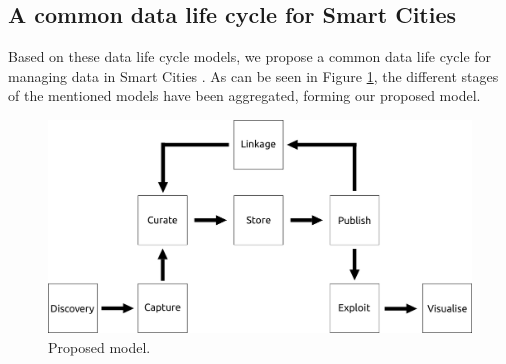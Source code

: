 \subsection{A common data life cycle for Smart Cities}

Based on these data life cycle models, we propose a common data life cycle  for managing data in Smart Cities . As can be seen in Figure \ref{fig:model}, the different stages of the mentioned models have been aggregated, forming our proposed model.

\begin{figure}
    \center
    \includegraphics[width=0.9\linewidth]{img/data_lifecycle/model.pdf}
    \caption{Proposed model.}
    \label{fig:model}
\end{figure}

